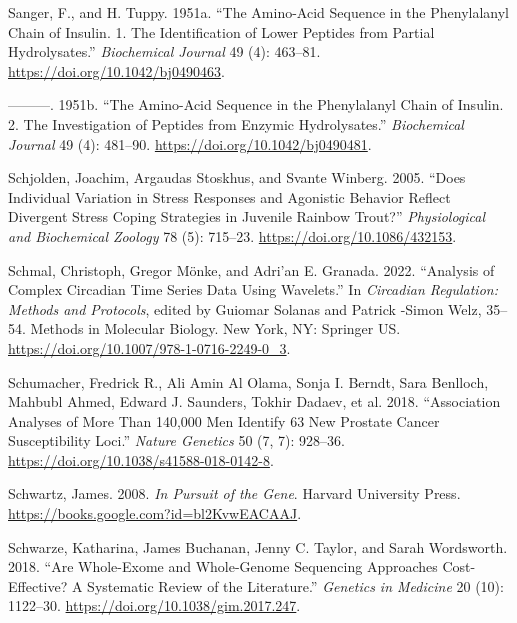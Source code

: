 \documentclass[
]{book}
\newlength{\cslhangindent}
\newlength{\cslentryspacingunit} %
\newenvironment{CSLReferences}[2] %
 {%
  \setlength{\parindent}{0pt}
  \ifodd #1
  \let\oldpar\par
  \def\par{\hangindent=\cslhangindent\oldpar}
  \fi
  \setlength{\parskip}{#2\cslentryspacingunit}
 }%
 {}
\begin{document}
\begin{CSLReferences}{1}{0}
\leavevmode{}%
Sanger, F., and H. Tuppy. 1951a. {``The Amino-Acid Sequence in the Phenylalanyl Chain of Insulin. 1. {The} Identification of Lower Peptides from Partial Hydrolysates.''} \emph{Biochemical Journal} 49 (4): 463--81. \url{https://doi.org/10.1042/bj0490463}.

\leavevmode{}%
---------. 1951b. {``The Amino-Acid Sequence in the Phenylalanyl Chain of Insulin. 2. {The} Investigation of Peptides from Enzymic Hydrolysates.''} \emph{Biochemical Journal} 49 (4): 481--90. \url{https://doi.org/10.1042/bj0490481}.

\leavevmode{}%
Schjolden, Joachim, Argaudas Stoskhus, and Svante Winberg. 2005. {``Does {Individual Variation} in {Stress Responses} and {Agonistic Behavior Reflect Divergent Stress Coping Strategies} in {Juvenile Rainbow Trout}?''} \emph{Physiological and Biochemical Zoology} 78 (5): 715--23. \url{https://doi.org/10.1086/432153}.

\leavevmode{}%
Schmal, Christoph, Gregor Mönke, and Adri'an E. Granada. 2022. {``Analysis of {Complex Circadian Time Series Data Using Wavelets}.''} In \emph{Circadian {Regulation}: {Methods} and {Protocols}}, edited by Guiomar Solanas and Patrick -Simon Welz, 35--54. Methods in {Molecular Biology}. {New York, NY}: {Springer US}. \url{https://doi.org/10.1007/978-1-0716-2249-0_3}.

\leavevmode{}%
Schumacher, Fredrick R., Ali Amin Al Olama, Sonja I. Berndt, Sara Benlloch, Mahbubl Ahmed, Edward J. Saunders, Tokhir Dadaev, et al. 2018. {``Association Analyses of More Than 140,000 Men Identify 63 New Prostate Cancer Susceptibility Loci.''} \emph{Nature Genetics} 50 (7, 7): 928--36. \url{https://doi.org/10.1038/s41588-018-0142-8}.

\leavevmode{}%
Schwartz, James. 2008. \emph{In {Pursuit} of the {Gene}}. {Harvard University Press}. \url{https://books.google.com?id=bl2KvwEACAAJ}.

\leavevmode{}%
Schwarze, Katharina, James Buchanan, Jenny C. Taylor, and Sarah Wordsworth. 2018. {``Are Whole-Exome and Whole-Genome Sequencing Approaches Cost-Effective? {A} Systematic Review of the Literature.''} \emph{Genetics in Medicine} 20 (10): 1122--30. \url{https://doi.org/10.1038/gim.2017.247}.


\end{CSLReferences}
\end{document}

